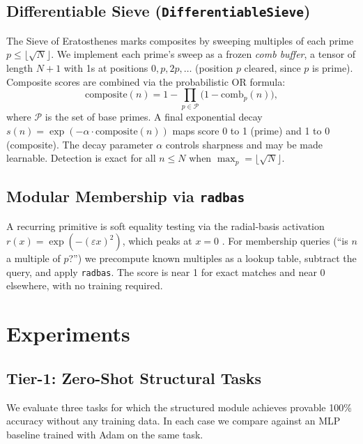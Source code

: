 \documentclass{article}
\begin{document}
\subsection{Differentiable Sieve (\texttt{DifferentiableSieve})}
\label{sec:sieve}

The Sieve of Eratosthenes marks composites by sweeping multiples of each prime
$p \leq \lfloor\sqrt{N}\rfloor$.
We implement each prime's sweep as a frozen \emph{comb buffer}, a tensor of length
$N{+}1$ with 1s at positions $0, p, 2p, \ldots$ (position $p$ cleared, since $p$ is
prime). Composite scores are combined via the probabilistic OR formula:
\begin{equation}
  \text{composite}(n) = 1 - \prod_{p \in \mathcal{P}} \bigl(1 - \text{comb}_p(n)\bigr),
\end{equation}
where $\mathcal{P}$ is the set of base primes. A final exponential decay
$s(n) = \exp(-\alpha \cdot \text{composite}(n))$ maps score 0 to 1 (prime) and 1 to 0
(composite). The decay parameter $\alpha$ controls sharpness and may be made learnable.
Detection is exact for all $n \leq N$ when $\max_p = \lfloor\sqrt{N}\rfloor$.

\subsection{Modular Membership via \texttt{radbas}}

A recurring primitive is soft equality testing via the radial-basis activation
$r(x) = \exp(-(\varepsilon x)^2)$, which peaks at $x{=}0$ \citep{paper1}.
For membership queries (``is $n$ a multiple of $p$?'') we precompute known multiples
as a lookup table, subtract the query, and apply \texttt{radbas}. The score is near 1
for exact matches and near 0 elsewhere, with no training required.

\section{Experiments}
\label{sec:experiments}

\subsection{Tier-1: Zero-Shot Structural Tasks}
\label{sec:tier1}

We evaluate three tasks for which the structured module achieves provable 100\% accuracy
without any training data. In each case we compare against an MLP baseline trained with
Adam \citep{adam2015} on the same task.
\end{document}
